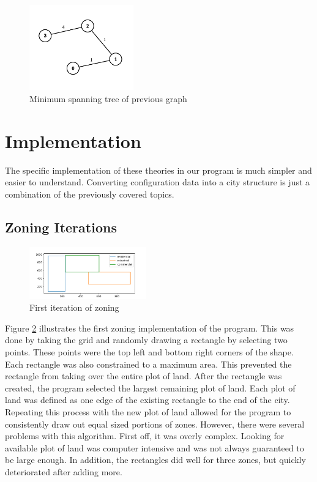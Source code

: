 \documentclass[11pt]{article}
\begin{document}
\begin{multicols}{2}
    \begin{figure}[H]
        \centering
        \includegraphics[width=0.4\textwidth]{images/mst.png}
        \caption{Minimum spanning tree of previous graph \cite{graphs}}
        \label{fig:mst-graph}
    \end{figure}

    \section{Implementation}

    \quad The specific implementation of these theories in our program is much simpler and easier to understand. Converting configuration data into a city structure is just a combination of the previously covered topics.
    
    \subsection{Zoning Iterations} \label{zoning-implementation}

    \begin{figure}[H]
        \centering
        \vspace{-3em}
        \includegraphics[width=0.45\textwidth]{images/first-zoning.png}
        \caption{First iteration of zoning}
        \label{fig:first-zoning}
    \end{figure}

    \quad Figure \ref{fig:first-zoning} illustrates the first zoning implementation of the program. This was done by taking the grid and randomly drawing a rectangle by selecting two points. These points were the top left and bottom right corners of the shape. Each rectangle was also constrained to a maximum area. This prevented the rectangle from taking over the entire plot of land. After the rectangle was created, the program selected the largest remaining plot of land. Each plot of land was defined as one edge of the existing rectangle to the end of the city. Repeating this process with the new plot of land allowed for the program to consistently draw out equal sized portions of zones. However, there were several problems with this algorithm. First off, it was overly complex. Looking for available plot of land was computer intensive and was not always guaranteed to be large enough. In addition, the rectangles did well for three zones, but quickly deteriorated after adding more. 


\end{multicols}
\end{document}

